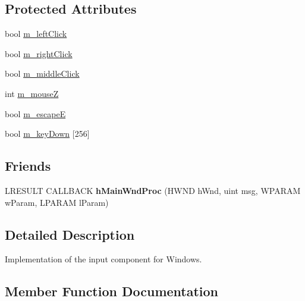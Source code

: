 \subsection*{Protected Attributes}
\begin{DoxyCompactItemize}
\item 
bool \hyperlink{class_w_i_c___win32_ab6af7475976aa0cfe19ecc233df5a6e5}{m\+\_\+left\+Click}
\item 
bool \hyperlink{class_w_i_c___win32_a92e3904726f4b216c33c2dcb1e441988}{m\+\_\+right\+Click}
\item 
bool \hyperlink{class_w_i_c___win32_a0f7ff5339ac45c9a67c67fc6d5d5e544}{m\+\_\+middle\+Click}
\item 
int \hyperlink{class_w_i_c___win32_ac03dc4e6a2718caff6007fcbf35fe3ab}{m\+\_\+mouseZ}
\item 
bool \hyperlink{class_w_i_c___win32_a41480b502fe374514f4d4d0e53ea2984}{m\+\_\+escapeE}
\item 
bool \hyperlink{class_w_i_c___win32_af07652b15f2a84c0a83b262f5431cde6}{m\+\_\+key\+Down} \mbox{[}256\mbox{]}
\end{DoxyCompactItemize}
\subsection*{Friends}
\begin{DoxyCompactItemize}
\item 
L\+R\+E\+S\+U\+LT C\+A\+L\+L\+B\+A\+CK {\bfseries h\+Main\+Wnd\+Proc} (H\+W\+ND h\+Wnd, uint msg, W\+P\+A\+R\+AM w\+Param, L\+P\+A\+R\+AM l\+Param)\hypertarget{class_w_i_c___win32_ad61870a786cd6198eba1008d80ce75b8}{}\label{class_w_i_c___win32_ad61870a786cd6198eba1008d80ce75b8}

\end{DoxyCompactItemize}


\subsection{Detailed Description}
Implementation of the input component for Windows. 

\subsection{Member Function Documentation}
